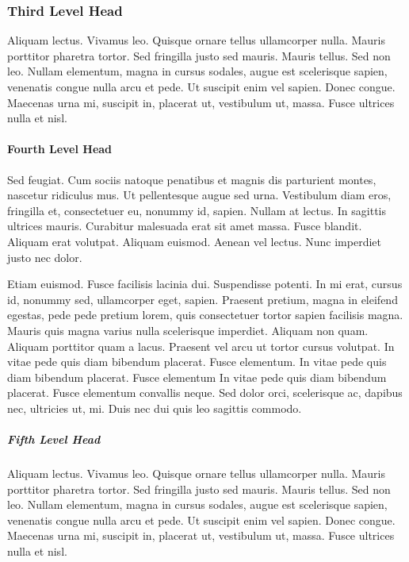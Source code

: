 \documentclass[ASNA,twocolumn]{USG} %
\begin{document}
\subsubsection{Third Level Head}

Aliquam lectus. Vivamus leo. Quisque ornare tellus ullamcorper nulla. Mauris porttitor pharetra tortor. Sed fringilla
justo sed mauris. Mauris tellus. Sed non leo. Nullam elementum, magna in cursus sodales, augue est scelerisque
sapien, venenatis congue nulla arcu et pede. Ut suscipit enim vel sapien. Donec congue. Maecenas urna mi, suscipit
in, placerat ut, vestibulum ut, massa. Fusce ultrices nulla et nisl.

\paragraph{Fourth Level Head}

Sed feugiat. Cum sociis natoque penatibus et magnis dis parturient montes, nascetur ridiculus mus. Ut pellentesque
augue sed urna. Vestibulum diam eros, fringilla et, consectetuer eu, nonummy id, sapien. Nullam at lectus. In sagittis
ultrices mauris. Curabitur malesuada erat sit amet massa. Fusce blandit. Aliquam erat volutpat. Aliquam euismod.
Aenean vel lectus. Nunc imperdiet justo nec dolor.

Etiam euismod. Fusce facilisis lacinia dui. Suspendisse potenti. In mi erat, cursus id, nonummy sed, ullamcorper
eget, sapien. Praesent pretium, magna in eleifend egestas, pede pede pretium lorem, quis consectetuer tortor sapien
facilisis magna. Mauris quis magna varius nulla scelerisque imperdiet. Aliquam non quam. Aliquam porttitor quam
a lacus. Praesent vel arcu ut tortor cursus volutpat. In vitae pede quis diam bibendum placerat. Fusce elementum.  In vitae pede quis diam bibendum placerat. Fusce elementum In vitae pede quis diam bibendum placerat. Fusce elementum
convallis neque. Sed dolor orci, scelerisque ac, dapibus nec, ultricies ut, mi. Duis nec dui quis leo sagittis commodo.

\subparagraph{Fifth Level Head}

Aliquam lectus. Vivamus leo. Quisque ornare tellus ullamcorper nulla. Mauris porttitor pharetra
tortor. Sed fringilla justo sed mauris. Mauris tellus. Sed non leo. Nullam elementum, magna in cursus sodales, augue
est scelerisque sapien, venenatis congue nulla arcu et pede. Ut suscipit enim vel sapien. Donec congue. Maecenas
urna mi, suscipit in, placerat ut, vestibulum ut, massa. Fusce ultrices nulla et nisl.
\end{document}
